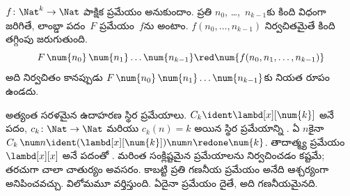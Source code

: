 \documentclass[../../../include/open-logic-section]{subfiles}
\begin{document}
\begin{defn}
$f\colon \Nat^k \to \Nat$ పాక్షిక ప్రమేయం అనుకుందాం. ప్రతి
$n_0$, \dots,~$n_{k-1}$కు కింది విధంగా జరిగితే,
లాంబ్డా పదం~$F$ ప్రమేయం~$f$ను
\emph{} అంటాం.
$f(n_0, \dots, n_{k-1})$ నిర్వచితమైతే కింది తగ్గింపు జరుగుతుంది.
\[
F \, \num{n_0} \, \num{n_1} \dots \num{n_{k-1}} \red \num{f(n_0, n_1, \dots,
  n_{k-1})}
\]
అది నిర్వచితం కానప్పుడు
$F \, \num{n_0} \, \num{n_1} \dots \num{n_{k-1}}$కు
నియత రూపం ఉండదు.
\end{defn}

అత్యంత సరళమైన ఉదాహరణ స్థిర ప్రమేయాలు. $C_k \ident
\lambd[x][\num{k}]$ అనే పదం, $c_k\colon \Nat \to
\Nat$ మరియు $c_k(n)=k$ అయిన స్థిర ప్రమేయాన్ని
.
ఏ $n$కైనా $C_k \, \num n \ident
(\lambd[x][\num{k}])\num n \redone \num{k}$.
తాదాత్మ్య ప్రమేయం $\lambd[x][x]$ అనే పదంతో
.
మరింత సంక్లిష్టమైన ప్రమేయాలను నిర్వచించడం కష్టమే;
తరచుగా చాలా చాతుర్యం అవసరం. కాబట్టి ప్రతి గణనీయ ప్రమేయం
 అనేది
ఆశ్చర్యంగా అనిపించవచ్చు. విలోమమూ వర్తిస్తుంది.
ఏదైనా ప్రమేయం దైతే,
అది గణనీయమైనది.
\end{document}
